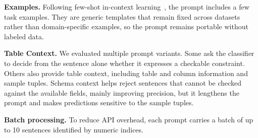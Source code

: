 \smallskip\noindent\textbf{Examples.} Following few-shot in-context learning~\cite{brown2020language}, the prompt includes a few task examples. They are generic templates that remain fixed across datasets rather than domain-specific examples, so the prompt remains portable without labeled data.




\smallskip\noindent\textbf{Table Context.}
We evaluated multiple prompt variants. 
Some ask the classifier to decide from the sentence alone whether it expresses a checkable constraint.
Others also provide table context, including table and column information and sample tuples. Schema context helps reject sentences that cannot be checked against the available fields, mainly improving precision, but it lengthens the prompt and makes predictions sensitive to the sample tuples.

\smallskip\noindent\textbf{Batch processing.}
To reduce API overhead, each prompt carries a batch of up to 10 sentences identified by numeric indices.











